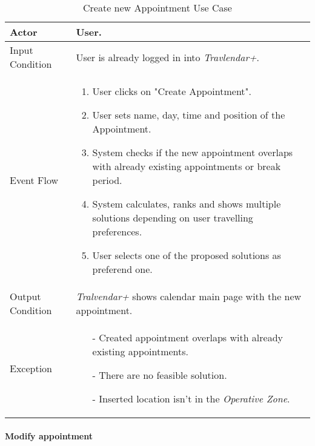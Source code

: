 		\begin{table}[H]
			\begin{tabular}{| l | p{} | }
				\hline
				\hline
				Actor	&		User. \\
				\hline
				Input Condition		&		User is already logged in into \textit{Travlendar+}. \\
				\hline
				Event Flow		&		\begin{enumerate}
													\item User clicks on "Create Appointment".
													\item User sets name, day, time and position of the Appointment.
													\item System checks if the new appointment overlaps with already existing appointments or break period.
													\item	 System calculates, ranks and shows multiple solutions depending on user travelling preferences.
													\item User selects one of the proposed solutions as preferend one.
												\end{enumerate} \\
				\hline
				Output Condition		&		\textit{Tralvendar+} shows calendar main page with the new appointment. \\
				\hline		
				Exception		&		\begin{itemize}
												\item[-] Created appointment overlaps with already existing appointments.
												\item[-] There are no feasible solution.
												\item[-] Inserted location isn't in the \textit{Operative Zone}.
											\end{itemize} \\
				\hline
				\hline
			\end{tabular}
			\caption{Create new Appointment Use Case}
		\end{table}



	\paragraph{Modify appointment}
	
